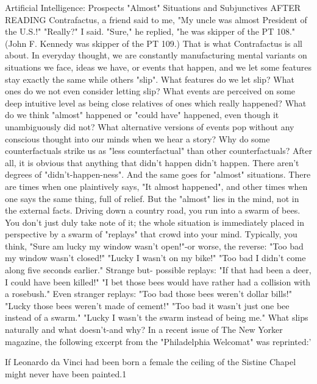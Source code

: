                           Artificial Intelligence:
                                 Prospects
                     "Almost" Situations and Subjunctives
AFTER READING Contrafactus, a friend said to me, "My uncle was almost President of
the U.S.!" "Really?" I said. "Sure," he replied, "he was skipper of the PT 108." (John F.
Kennedy was skipper of the PT 109.)
         That is what Contrafactus is all about. In everyday thought, we are constantly
manufacturing mental variants on situations we face, ideas we have, or events that
happen, and we let some features stay exactly the same while others "slip". What features
do we let slip? What ones do we not even consider letting slip? What events are
perceived on some deep intuitive level as being close relatives of ones which really
happened? What do we think "almost" happened or "could have" happened, even though
it unambiguously did not? What alternative versions of events pop without any conscious
thought into our minds when we hear a story? Why do some counterfactuals strike us as
"less counterfactual" than other counterfactuals? After all, it is obvious that anything that
didn't happen didn't happen. There aren't degrees of "didn't-happen-ness". And the same
goes for "almost" situations. There are times when one plaintively says, "It almost
happened", and other times when one says the same thing, full of relief. But the "almost"
lies in the mind, not in the external facts.
         Driving down a country road, you run into a swarm of bees. You don't just duly
take note of it; the whole situation is immediately placed in perspective by a swarm of
"replays" that crowd into your mind. Typically, you think, "Sure am lucky my window
wasn't open!"-or worse, the reverse: "Too bad my window wasn't closed!" "Lucky I
wasn't on my bike!" "Too bad I didn't come along five seconds earlier." Strange but-
possible replays: "If that had been a deer, I could have been killed!" "I bet those bees
would have rather had a collision with a rosebush." Even stranger replays: "Too bad
those bees weren't dollar bills!" "Lucky those bees weren't made of cement!" "Too bad it
wasn't just one bee instead of a swarm." "Lucky I wasn't the swarm instead of being me."
What slips naturally and what doesn't-and why?
         In a recent issue of The New Yorker magazine, the following excerpt from the
"Philadelphia Welcomat" was reprinted:'

   If Leonardo da Vinci had been born a female the ceiling of the Sistine Chapel
   might never have been painted.1




